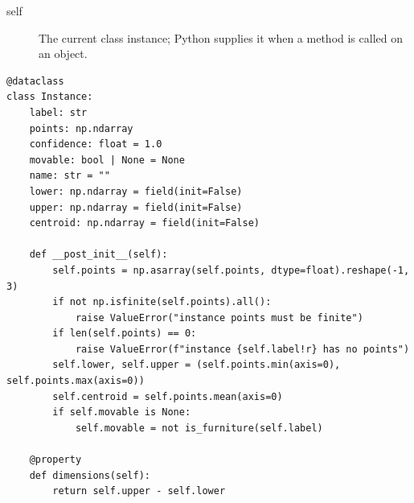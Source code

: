 \documentclass[11pt,a4paper]{book}
\begin{document}
\begin{description}
\item[self] The current class instance; Python supplies it when a method is called on an object.
\end{description}

\begin{lstlisting}[firstnumber=135]
@dataclass
class Instance:
    label: str
    points: np.ndarray
    confidence: float = 1.0
    movable: bool | None = None
    name: str = ""
    lower: np.ndarray = field(init=False)
    upper: np.ndarray = field(init=False)
    centroid: np.ndarray = field(init=False)

    def __post_init__(self):
        self.points = np.asarray(self.points, dtype=float).reshape(-1, 3)
        if not np.isfinite(self.points).all():
            raise ValueError("instance points must be finite")
        if len(self.points) == 0:
            raise ValueError(f"instance {self.label!r} has no points")
        self.lower, self.upper = (self.points.min(axis=0), self.points.max(axis=0))
        self.centroid = self.points.mean(axis=0)
        if self.movable is None:
            self.movable = not is_furniture(self.label)

    @property
    def dimensions(self):
        return self.upper - self.lower


\end{lstlisting}
\end{document}
